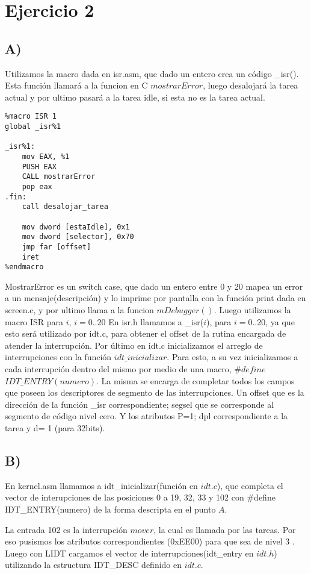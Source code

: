 \section{Ejercicio 2}
\subsection*{A)}
Utilizamos la macro dada en isr.asm, que dado un entero crea un c\'odigo \_isr(). Esta funci\'on llamar\'a a la funcion en C $mostrarError$, luego desalojar\'a la  tarea actual y 
por ultimo pasar\'a a la tarea idle, si esta no es la tarea actual.

\begin{codesnippet}
\begin{verbatim}
%macro ISR 1
global _isr%1

_isr%1:
    mov EAX, %1
    PUSH EAX
    CALL mostrarError
    pop eax
.fin:
    call desalojar_tarea
    
    mov dword [estaIdle], 0x1
    mov dword [selector], 0x70
	jmp far [offset]
    iret
%endmacro
\end{verbatim}
\end{codesnippet}

MostrarError es un switch case, que dado un entero entre 0 y 20 mapea un error a un mensaje(descripci\'on) y lo imprime por pantalla con la funci\'on print dada en screen.c, 
y por ultimo llama a la funcion $mDebugger()$.
Luego utilizamos la macro ISR para $i$, $i= 0..20$
En isr.h llamamos a \_isr($i$), para $i= 0..20$, ya que esto ser\'a utilizado por idt.c, para obtener el offset de la rutina encargada de atender la interrupci\'on. \newline
Por \'ultimo en idt.c inicializamos el arreglo de interrupciones con la funci\'on $idt\_inicializar$. Para esto, a su vez inicializamos a cada interrupci\'on dentro del mismo 
por medio de una macro, \#$define$ $IDT\_ENTRY(numero)$. La misma se encarga de completar todos los campos que poseen los descriptores de segmento de las interrupciones. 
Un offset que es la direcci\'on de la funci\'on \_isr correspondiente; segsel que se corresponde al segmento de c\'odigo nivel cero. Y los atributos 
P=1; dpl correspondiente a la tarea y d= 1 (para 32bits). 

\subsection*{B)}
En kernel.asm llamamos a idt\_inicializar(función en $idt.c$), que completa el vector de interupciones de las posiciones 0 a 19, 32, 33 y 102 con \#define IDT\_ENTRY(numero) de la 
forma descripta en el punto $A$.

 
 
  La entrada 102 es la interrupción $mover$, la cual es llamada por las tareas. Por eso pusismos los atributos correspondientes (0xEE00) para que sea de 
nivel 3\color{black} . Luego con LIDT cargamos el vector de interrupciones(idt_entry en $idt.h$) utilizando la estructura IDT_DESC definido en $idt.c$.
